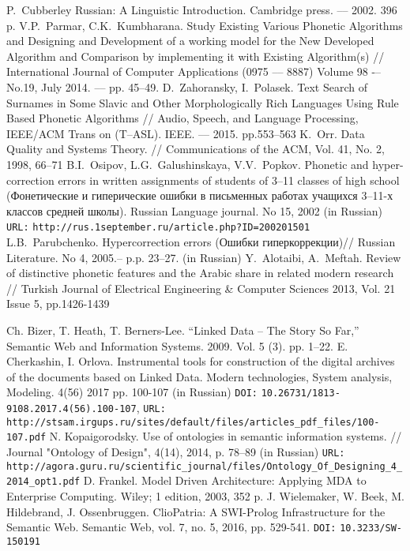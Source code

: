 \documentclass[conference,a4paper]{IEEEtran}
\providecommand\url[1]{\texttt{#1}}
\begin{document}
\begin{thebibliography}{11}

 P.~Cubberley Russian: A Linguistic Introduction. Cambridge press. --– 2002. 396 p.
	V.P.~Parmar, C.K.~Kumbharana. Study Existing Various Phonetic Algorithms and Designing and Development of a working model for the New Developed Algorithm and Comparison by implementing it with Existing Algorithm(s) // International Journal of Computer Applications (0975 –-- 8887) Volume 98 -– No.19, July 2014. --– pp. 45--49.
 D.~Zahoransky, I.~Polasek. Text Search of Surnames in Some Slavic and Other Morphologically Rich Languages Using Rule Based Phonetic Algorithms // Audio, Speech, and Language Processing, IEEE/ACM Trans on (T--ASL). IEEE. --– 2015. pp.553--563
 K.~Orr. Data Quality and Systems Theory. // Communications of the ACM, Vol. 41, No. 2, 1998, 66--71
	B.I.~Osipov, L.G.~Galushinskaya, V.V.~Popkov. Phonetic and hyper-correction errors in written assignments of students of 3--11 classes of high school (Фонетические и гиперические ошибки в письменных работах учащихся 3–11-х классов средней школы). Russian Language journal. No 15, 2002 (in Russian) \texttt{URL:} \url{http://rus.1september.ru/article.php?ID=200201501}
 L.B.~Parubchenko. Hypercorrection errors (Ошибки гиперкоррекции)// Russian Literature. No 4, 2005.-- p.p. 23--27. (in Russian)
 Y.~Alotaibi, A.~Meftah. Review of distinctive phonetic features and the Arabic share in related modern research // Turkish Journal of Electrical Engineering \& Computer Sciences 2013, Vol. 21 Issue 5, pp.1426-1439


 Ch. Bizer, T. Heath, T. Berners-Lee. ``Linked Data – The Story So Far,'' Semantic Web and Information Systems. 2009. Vol. 5 (3). pp. 1–22.
 E. Cherkashin, I. Orlova. Instrumental tools for construction of the digital archives of the documents based on Linked Data. Modern technologies, System analysis, Modeling. 4(56) 2017 pp. 100-107 (in Russian) \texttt{DOI:} \url{10.26731/1813-9108.2017.4(56).100-107}, \texttt{URL:} \url{http://stsam.irgups.ru/sites/default/files/articles\_pdf\_files/100-107.pdf}
 N. Kopaigorodsky. Use of ontologies in semantic information systems. // Journal "Ontology of Design", 4(14), 2014, p. 78--89 (in Russian) \texttt{URL:} \url{http://agora.guru.ru/scientific\_journal/files/Ontology\_Of\_Designing\_4\_2014\_opt1.pdf}
 D. Frankel. Model Driven Architecture: Applying MDA to Enterprise Computing. Wiley; 1 edition, 2003, 352 p.
  J. Wielemaker, W. Beek, M. Hildebrand, J. Ossenbruggen. ClioPatria: A SWI-Prolog Infrastructure for the Semantic Web. Semantic Web, vol. 7, no. 5, 2016, pp. 529-541. \texttt{DOI:} \url{10.3233/SW-150191}


\end{thebibliography}
\end{document}

